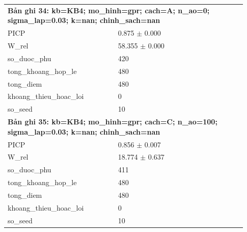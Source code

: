 \begin{longtable}{p{0.43\linewidth}p{0.50\linewidth}}
\midrule
\multicolumn{2}{p{0.95\linewidth}}{\textbf{Bản ghi 34: kb=KB4; mo\_hinh=gpr; cach=A; n\_ao=0; sigma\_lap=0.03; k=nan; chinh\_sach=nan}} \\
PICP & 0.875 $\pm$ 0.000 \\
W\_\allowbreak rel & 58.355 $\pm$ 0.000 \\
so\_\allowbreak duoc\_\allowbreak phu & 420 \\
tong\_\allowbreak khoang\_\allowbreak hop\_\allowbreak le & 480 \\
tong\_\allowbreak diem & 480 \\
khoang\_\allowbreak thieu\_\allowbreak hoac\_\allowbreak loi & 0 \\
so\_\allowbreak seed & 10 \\
\midrule
\multicolumn{2}{p{0.95\linewidth}}{\textbf{Bản ghi 35: kb=KB4; mo\_hinh=gpr; cach=C; n\_ao=100; sigma\_lap=0.03; k=nan; chinh\_sach=nan}} \\
PICP & 0.856 $\pm$ 0.007 \\
W\_\allowbreak rel & 18.774 $\pm$ 0.637 \\
so\_\allowbreak duoc\_\allowbreak phu & 411 \\
tong\_\allowbreak khoang\_\allowbreak hop\_\allowbreak le & 480 \\
tong\_\allowbreak diem & 480 \\
khoang\_\allowbreak thieu\_\allowbreak hoac\_\allowbreak loi & 0 \\
so\_\allowbreak seed & 10 \\
\midrule
\bottomrule
\end{longtable}
